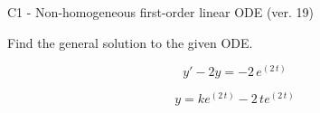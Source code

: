 \begin{exercise}
  \begin{exerciseTitle}C1 - Non-homogeneous first-order linear ODE (ver. 19)\end{exerciseTitle}
  \begin{exerciseStatement}
    
Find the general solution to the given ODE.

    
\[y'-2y= -2 \, e^{\left(2 \, t\right)}\]

  \end{exerciseStatement}
  \begin{exerciseAnswer}
    
\[y= k e^{\left(2 \, t\right)} - 2 \, t e^{\left(2 \, t\right)}\]

  \end{exerciseAnswer}
\end{exercise}